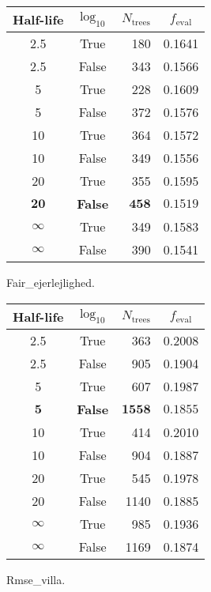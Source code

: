 \begin{margintable}
  \begin{tabular}{@{}ccrc@{}}
    Half-life & $\log_{10}$ & $N_\mathrm{trees}$ & $f_\mathrm{eval}$ \\
    \midrule
    \num{2.5} & True & \num{180} & \num{0.1641} \\
    \num{2.5} & False & \num{343} & \num{0.1566} \\
    \num{5} & True & \num{228} & \num{0.1609} \\
    \num{5} & False & \num{372} & \num{0.1576} \\
    \num{10} & True & \num{364} & \num{0.1572} \\
    \num{10} & False & \num{349} & \num{0.1556} \\
    \num{20} & True & \num{355} & \num{0.1595} \\
    $\mathbf{20}$ & \textbf{False} & $\mathbf{458}$ & $\mathbf{0.1519}$ \\
    $\infty$ & True & \num{349} & \num{0.1583} \\
    $\infty$ & False & \num{390} & \num{0.1541} \\
  \end{tabular}
  \caption{\label{tab:h:HPO_initial_Fair_ejerlejlighed}Fair_ejerlejlighed.}
\end{margintable}


\begin{margintable}
  \begin{tabular}{@{}ccrc@{}}
    Half-life & $\log_{10}$ & $N_\mathrm{trees}$ & $f_\mathrm{eval}$ \\
    \midrule
    \num{2.5} & True & \num{363} & \num{0.2008} \\
    \num{2.5} & False & \num{905} & \num{0.1904} \\
    \num{5} & True & \num{607} & \num{0.1987} \\
    $\mathbf{5}$ & \textbf{False} & $\mathbf{1558}$ & $\mathbf{0.1855}$ \\
    \num{10} & True & \num{414} & \num{0.2010} \\
    \num{10} & False & \num{904} & \num{0.1887} \\
    \num{20} & True & \num{545} & \num{0.1978} \\
    \num{20} & False & \num{1140} & \num{0.1885} \\
    $\infty$ & True & \num{985} & \num{0.1936} \\
    $\infty$ & False & \num{1169} & \num{0.1874} \\
  \end{tabular}
  \caption{\label{tab:h:HPO_initial_Rmse_villa}Rmse_villa.}
\end{margintable}

